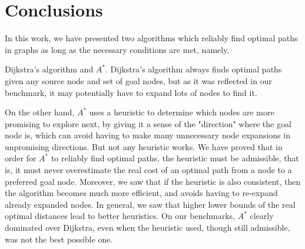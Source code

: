 \documentclass[a4paper,10pt]{report}
\begin{document}
%
%
%
%





\chapter{Conclusions}
In this work, we have presented two algorithms which reliably find optimal paths in graphs as long as the necessary conditions are met, namely, 

Dijkstra's algorithm and $A^*$. Dijkstra's algorithm always finds optimal paths given any source node and set of goal nodes, but as it was reflected in our benchmark, it may potentially have to expand lots of nodes to find it. 

On the other hand, $A^*$ uses a heuristic to determine which nodes are more promising to explore next, by giving it a sense of the "direction" where the goal node is, which can avoid having to make many unnecessary node expansions in unpromising directions. But not any heuristic works. We have proved that in order for $A^*$ to reliably find optimal paths, the heuristic must be admissible, that is, it must never overestimate the real cost of an optimal path from a node to a preferred goal node. Moreover, we saw that if the heuristic is also consistent, then the algorithm becomes much more efficient, and avoids having to re-expand already expanded nodes. In general, we saw that higher lower bounds of the real optimal distances lead to better heuristics. On our benchmarks, $A^*$ clearly dominated over Dijkstra, even when the heuristic used, though still admissible, was not the best possible one.
\end{document}
